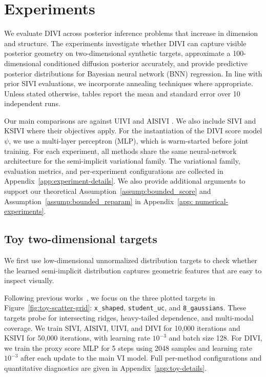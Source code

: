 \section{Experiments}
\label{sec:experiments}

We evaluate DIVI across posterior inference problems that increase in dimension and structure. 
The experiments investigate whether DIVI can capture visible posterior geometry on two-dimensional synthetic targets, approximate a 100-dimensional conditioned diffusion posterior accurately, and provide predictive posterior distributions for Bayesian neural network (BNN) regression.  In line with prior SIVI evaluations, we incorporate annealing techniques where appropriate. 
Unless stated otherwise, tables report the mean and standard error over 10 independent runs.

Our main comparisons are against UIVI and AISIVI \citep{titsias2019unbiased,pielok2025revisiting}.  We also include SIVI \citep{yin2018semi} and KSIVI \citep{cheng2024kernel} where their objectives apply. For the instantiation of the DIVI score model $\psi$, we use a multi-layer perceptron (MLP), which is warm-started before joint training. For each experiment, all methods share the same neural-network architecture for the semi-implicit variational family.
The variational family, evaluation metrics, and per-experiment configurations are collected in Appendix~\ref{app:experiment-details}. We also provide additional arguments to support our theoretical Assumption~\ref{assump:bounded_score} and Assumption~\ref{assump:bounded_reparam} in Appendix~\ref{app: numerical-experiments}.

\subsection{Toy two-dimensional targets}
\label{subsec:toy-experiments}

We first use low-dimensional  unnormalized distribution targets to check whether the learned semi-implicit distribution captures geometric features that are easy to inspect visually.


Following previous works~\citep{yu2023semi,li2023samplingmollifiedinteractionenergy, yu2023hierarchical}, we focus on the three plotted targets in Figure~\ref{fig:toy-scatter-grid}: \texttt{x\_shaped}, \texttt{student\_uc}, and \texttt{8\_gaussians}.  These targets probe for intersecting ridges, heavy-tailed dependence, and multi-modal coverage. We train SIVI, AISIVI, UIVI, and DIVI for 10,000 iterations and KSIVI for 50,000 iterations, with learning rate $10^{-3}$ and batch size 128. For DIVI, we train the proxy score MLP for 5 steps using 2048 samples and learning rate $10^{-3}$ after each update to the main VI model. Full per-method configurations and quantitative diagnostics are given in Appendix~\ref{app:toy-details}.


